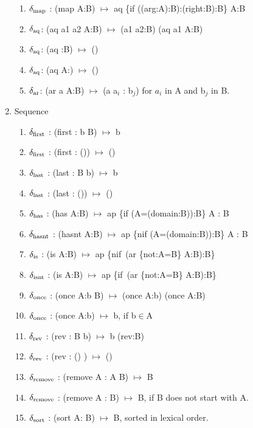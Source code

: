 \documentclass[11pt]{article}
\begin{document}
\begin{enumerate}
\begin{enumerate}
\item{$\delta_{\rm map}$ : (map A:B) $\mapsto$ aq \{if ((arg:A):B):(right:B):B\} A:B}
\item{$\delta_{\rm aq}$: (aq a1 a2 A:B) $\mapsto$ (a1 a2:B) (aq a1 A:B)}
\item{$\delta_{\rm aq}$: (aq :B) $\mapsto$ ()}
\item{$\delta_{\rm aq}$: (aq A:) $\mapsto$ ()}
\item{$\delta_{\rm ar}$: (ar a A:B) $\mapsto$ (a a$_i$ : b$_j$) for $a_i$ in A and b$_j$ in B.} 
\end{enumerate}
\item{Sequence 
\begin{enumerate}
\item{$\delta_{\rm first}$ : (first : b B) $\mapsto$ b}
\item{$\delta_{\rm first}$ : (first : ()) $\mapsto$ ()} 
\item{$\delta_{\rm last}$ : (last : B b) $\mapsto$ b} 
\item{$\delta_{\rm last}$ : (last : ()) $\mapsto$ ()} 
\item{$\delta_{\rm has}$ : (has A:B) $\mapsto$ ap \{if (A=(domain:B)):B\} A : B}
\item{$\delta_{\rm hasnt}$ : (hasnt A:B) $\mapsto$ ap \{nif (A=(domain:B)):B\} A : B}
\item{$\delta_{\rm is}$ : (is A:B) $\mapsto$ ap \{nif\ (ar \{not:A=B\} A:B):B\} }
\item{$\delta_{\rm isnt}$ : (is A:B) $\mapsto$ ap \{if\ (ar \{not:A=B\} A:B):B\} }
\item{$\delta_{\rm once}$ : (once A:b B) $\mapsto$ (once A:b) (once A:B)} 
\item{$\delta_{\rm once}$ : (once A:b) $\mapsto$ b, if b$\in$A}
\item{$\delta_{\rm rev}$ : (rev : B b) $\mapsto$ b (rev:B)} 
\item{$\delta_{\rm rev}$ : (rev : () ) $\mapsto$ ()}
\item{$\delta_{\rm remove}$ : (remove A : A B) $\mapsto$ B} 
\item{$\delta_{\rm remove}$ : (remove A : B) $\mapsto$ B, if B does not start with A.} 
\item{$\delta_{\rm sort}$ : (sort A: B) $\mapsto$ B, sorted in lexical order.} 
\end{enumerate} 
}
\end{enumerate}

\end{document}

